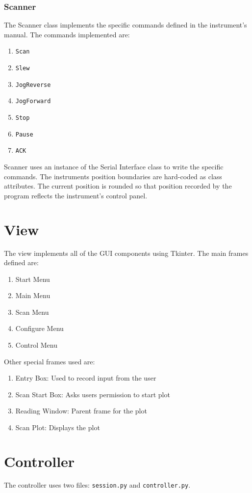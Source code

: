 \documentclass[11pt]{article}
\begin{document}
\subsubsection{Scanner}
The Scanner class implements the specific commands defined in the instrument's manual. The commands implemented are:
\begin{enumerate}
    \item \texttt{Scan}
    \item \texttt{Slew}
    \item \texttt{JogReverse}
    \item \texttt{JogForward}
    \item \texttt{Stop}
    \item \texttt{Pause}
    \item \texttt{ACK}
\end{enumerate}
Scanner uses an instance of the Serial Interface class to write the specific commands.
The instruments position boundaries are hard-coded as class attributes.  
The current position is rounded so that position recorded by the program reflects the instrument's control panel. 
\section{View}
The view implements all of the GUI components using Tkinter. The main frames defined are:
\begin{enumerate}
    \item Start Menu
    \item Main Menu
    \item Scan Menu
    \item Configure Menu
    \item Control Menu
\end{enumerate}
Other special frames used are:
\begin{enumerate}
    \item Entry Box: Used to record input from the user 
    \item Scan Start Box: Asks users permission to start plot 
    \item Reading Window: Parent frame for the plot 
    \item Scan Plot: Displays the plot  
\end{enumerate}
\section{Controller}
The controller uses two files: \texttt{session.py} and \texttt{controller.py}.
\end{document}

